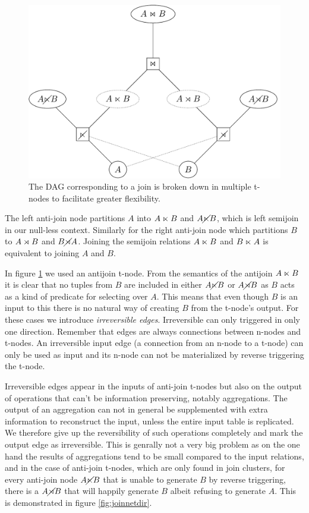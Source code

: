 \begin{figure}[H]
  \centering \includegraphics[width=.9\linewidth]{./imgs/joinnet.pdf}
  \caption{\label{fig:joinnet}The DAG corresponding to a join is
    broken down in multiple t-nodes to facilitate greater
    flexibility.}
\end{figure}


The left anti-join node partitions \(A\) into \(A \ltimes B\) and
\(A \cancel\ltimes B\), which is left semijoin in our null-less
context. Similarly for the right anti-join node which partitions \(B\)
to \(A \rtimes B\) and \(B \cancel\rtimes A\). Joining the semijoin relations
\(A \ltimes B\) and \(B \ltimes A\) is equivalent to joining \(A\) and
\(B\).

In figure \ref{fig:joinnet} we used an antijoin t-node. From the
semantics of the antijoin \(A \ltimes B\) it is clear that no tuples
from \(B\) are included in either \(A \cancel\ltimes B\) or \(A \cancel\rtimes B\)
as \(B\) acts as a kind of predicate for selecting over \(A\). This
means that even though \(B\) is an input to this there is no natural
way of creating \(B\) from the t-node's output. For these cases we
introduce \emph{irreversible edges}. Irreversible can only triggered
in only one direction. Remember that edges are always connections
between n-nodes and t-nodes. An irreversible input edge (a connection
from an n-node to a t-node) can only be used as input and its n-node
can not be materialized by reverse triggering the t-node.

Irreversible edges appear in the inputs of anti-join t-nodes but also
on the output of operations that can't be information preserving,
notably aggregations. The output of an aggregation can not in general
be supplemented with extra information to reconstruct the input,
unless the entire input table is replicated. We therefore give up the
reversibility of such operations completely and mark the output edge
as irreversible. This is genrally not a very big problem as on the one
hand the results of aggregations tend to be small compared to the
input relations, and in the case of anti-join t-nodes, which are only
found in join clusters, for every anti-join node \(A \cancel\ltimes B\) that
is unable to generate \(B\) by reverse triggering, there is a \(A
\cancel\rtimes B\) that will happily generate \(B\) albeit refusing to
generate \(A\). This is demonstrated in figure \ref{fig:joinnetdir}.

